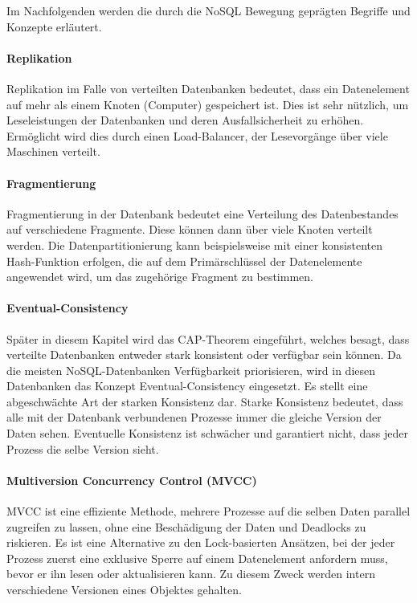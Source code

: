 Im Nachfolgenden werden die durch die NoSQL Bewegung geprägten Begriffe und Konzepte erläutert.

\paragraph{Replikation} Replikation im Falle von verteilten Datenbanken bedeutet, dass ein Datenelement auf mehr als einem Knoten (Computer) gespeichert ist. Dies ist sehr nützlich, um Leseleistungen der Datenbanken und deren Ausfallsicherheit zu erhöhen. Ermöglicht wird dies durch einen Load-Balancer, der Lesevorgänge über viele Maschinen verteilt.

\paragraph{Fragmentierung} Fragmentierung in der Datenbank bedeutet eine Verteilung des Datenbestandes auf verschiedene Fragmente. Diese können dann über viele Knoten verteilt werden. Die Datenpartitionierung kann beispielsweise mit einer konsistenten Hash-Funktion erfolgen, die auf dem Primärschlüssel der Datenelemente angewendet wird, um das zugehörige Fragment zu bestimmen.

\paragraph{Eventual-Consistency} Später in diesem Kapitel wird das CAP-Theorem eingeführt, welches besagt, dass verteilte Datenbanken entweder stark konsistent oder verfügbar sein können. Da die meisten NoSQL-Datenbanken Verfügbarkeit priorisieren, wird in diesen Datenbanken das Konzept Eventual-Consistency eingesetzt. Es stellt eine abgeschwächte Art der starken Konsistenz dar. Starke Konsistenz bedeutet, dass alle mit der Datenbank verbundenen Prozesse immer die gleiche Version der Daten sehen. Eventuelle Konsistenz ist schwächer und garantiert nicht, dass jeder Prozess die selbe Version sieht.

\paragraph{Multiversion Concurrency Control (MVCC)} MVCC ist eine effiziente Methode, mehrere Prozesse auf die selben Daten parallel zugreifen zu lassen, ohne eine Beschädigung der Daten und Deadlocks zu riskieren. Es ist eine Alternative zu den Lock-basierten Ansätzen, bei der jeder Prozess zuerst eine exklusive Sperre auf einem Datenelement anfordern muss, bevor er ihn lesen oder aktualisieren kann. Zu diesem Zweck werden intern verschiedene Versionen eines Objektes gehalten.

